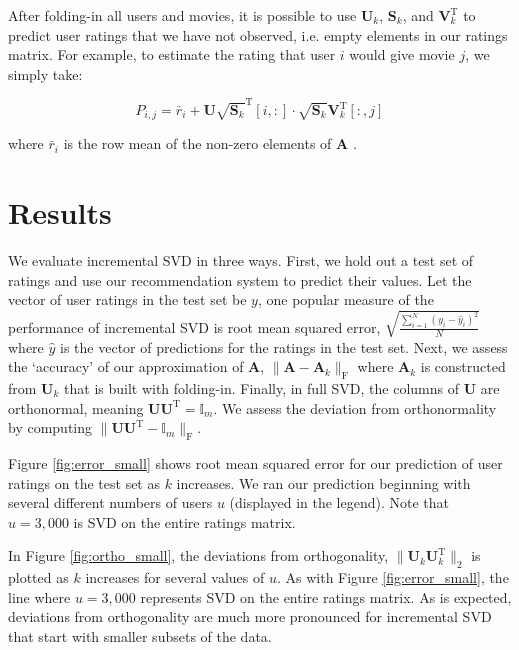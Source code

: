 \documentclass{article} %
\newcommand{\A}{\mathbf{A}}
\newcommand{\T}{\textrm{T}}
\begin{document}
After folding-in all users and movies, it is possible to use $\mathbf{U}_k$, $\mathbf{S}_k$, and $\mathbf{V}_k^{\T}$ to predict user ratings that we have not observed, i.e. empty elements in our ratings matrix.
For example, to estimate the rating that user $i$ would give movie $j$, we simply take:

$$P_{i,j} = \bar{r}_i + \mathbf{U}\sqrt{\mathbf{S}_k}^{\T}[i,:]
\cdot \sqrt{\mathbf{S}_k}\mathbf{V}_k^{\T}[:,j]$$

where $\bar{r}_i$ is the row mean of the non-zero elements of $\A$ \citep{sarwar2002}.

\section{Results}

We evaluate incremental SVD in three ways.
First, we hold out a test set of ratings and use our recommendation system to predict their values.
Let the vector of user ratings in the test set be $y$, one popular measure of the performance of incremental SVD is root mean squared error, $\sqrt{\frac{\sum_{i=1}^N \left(y_i - \hat{y}_i\right)^2}{N}}$ where $\hat{y}$ is the vector of predictions for the ratings in the test set.
Next, we assess the `accuracy' of our approximation of $\A$, $\|\A - \A_k\|_{\textrm{F}}$ where $\A_k$ is constructed from $\mathbf{U}_k$ that is built with folding-in.
Finally, in full SVD, the columns of $\mathbf{U}$ are orthonormal, meaning $\mathbf{U}\mathbf{U}^{\T} = \mathbb{I}_m$.
We assess the deviation from orthonormality by computing $\|\mathbf{U}\mathbf{U}^{\T} - \mathbb{I}_m\|_{\textrm{F}}$.

Figure \ref{fig:error_small} shows root mean squared error for our prediction of user ratings on the test set as $k$ increases.
We ran our prediction beginning with several different numbers of 
users $u$ (displayed in the legend).
Note that $u = 3,000$ is SVD on the entire ratings matrix.

In Figure \ref{fig:ortho_small}, the deviations from orthogonality, 
$\|\mathbf{U}_k\mathbf{U}_k^{\T}\|_2$ is plotted as $k$ increases for several values of $u$. As with Figure \ref{fig:error_small}, the line where $u = 3,000$ represents SVD on the entire ratings matrix. As is expected, deviations from orthogonality are much more pronounced for incremental SVD that start with smaller subsets of the data.
\end{document}
